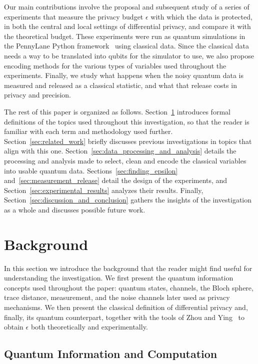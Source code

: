 \documentclass{ieeeaccess}
\begin{document}
Our main contributions involve the proposal and subsequent study of a series of experiments that measure the privacy budget $\epsilon$ with which the data is protected, in both the central and local settings of differential privacy, and compare it with the theoretical budget. These experiments were run as quantum simulations in the PennyLane Python framework~\cite{bergholm2018pennylane} using classical data. Since the classical data needs a way to be translated into qubits for the simulator to use, we also propose encoding methods for the various types of variables used throughout the experiments. Finally, we study what happens when the noisy quantum data is measured and released as a classical statistic, and what that release costs in privacy and precision.

The rest of this paper is organized as follows. Section~\ref{sec:background} introduces formal definitions of the topics used throughout this investigation, so that the reader is familiar with each term and methodology used further. Section~\ref{sec:related_work} briefly discusses previous investigations in topics that align with this one. Section~\ref{sec:data_processing_and_analysis} details the processing and analysis made to select, clean and encode the classical variables into usable quantum data. Sections~\ref{sec:finding_epsilon} and~\ref{sec:measurement_release} detail the design of the experiments, and Section~\ref{sec:experimental_results} analyzes their results. Finally, Section~\ref{sec:discussion_and_conclusion} gathers the insights of the investigation as a whole and discusses possible future work.

\section{Background}
\label{sec:background}

In this section we introduce the background that the reader might find useful for understanding the investigation. We first present the quantum information concepts used throughout the paper: quantum states, channels, the Bloch sphere, trace distance, measurement, and the noise channels later used as privacy mechanisms. We then present the classical definition of differential privacy and, finally, its quantum counterpart, together with the tools of Zhou and Ying~\cite{zhou2017differential} to obtain $\epsilon$ both theoretically and experimentally.

\subsection{Quantum Information and Computation}
\end{document}
